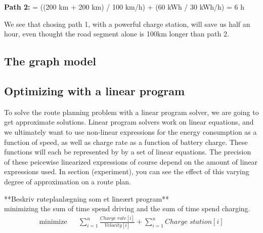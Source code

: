 \textbf{Path 2:}  = ((200 km + 200 km) / 100 km/h) + (60 kWh / 30 kWh/h) = 6 h
 
We see that chosing path 1, with a powerful charge station, will save us half an hour, even thought the road segment alone is 100km longer than path 2.

\subsection{The graph model}


\subsection{Optimizing with a linear program}
To solve the route planning problem with a linear program solver, we are going to get approximate solutions. Linear program solvers work on linear equations, and we ultimately want to use non-linear expressions for the energy consumption as a function of speed, as well as charge rate as a function of battery charge. These functions will each be represented by by a set of linear equations. The precision of these peicewise linearized expressions of course depend on the amount of linear expressions used. In section (experiment), you can see the effect of this varying degree of approximation on a route plan.

**Beskriv ruteplanlægning som et lineært program**\\

minimizing the sum of time spend driving and the sum of time spend charging. 
\begin{equation}
\begin{aligned}
{\text{minimize}}
& & \sum_{i=1}^{n} \frac{Charge\;rate[i]}{Velocity[i]} + \sum_{i=1}^{n} Charge\;station[i] \\
\end{aligned}
\end{equation}\label{eq:objfunction}

